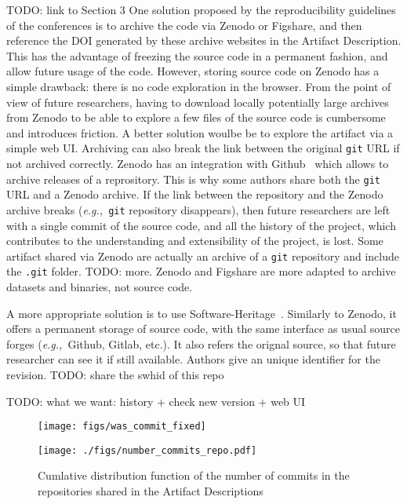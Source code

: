 \documentclass[sigconf,natbib=false]{acmart}
\newcommand{\eg}{\emph{e.g.,}}
\newcommand{\ad}{Artifact Description}
\newcommand{\todo}[1]{{\color{red}TODO: #1}}
\begin{document}
\todo{link to Section 3}
One solution proposed by the reproducibility guidelines of the conferences is to archive the code via Zenodo or Figshare, and then reference the DOI generated by these archive websites in the \ad.
This has the advantage of freezing the source code in a permanent fashion, and allow future usage of the code.
However, storing source code on Zenodo has a simple drawback: there is no code exploration in the browser.
From the point of view of future researchers, having to download locally potentially large archives from Zenodo to be able to explore a few files of the source code is cumbersome and introduces friction.
A better solution woulbe be to explore the artifact via a simple web UI.
Archiving can also break the link between the original \texttt{git} URL if not archived correctly.
Zenodo has an integration with Github\ \cite{github_zenodo} which allows to archive releases of a reprository.
This is why some authors share both the \texttt{git} URL and a Zenodo archive.
If the link between the repository and the Zenodo archive breaks (\eg\ \texttt{git} repository disappears), then future researchers are left with a single commit of the source code, and all the history of the project, which contributes to the understanding and extensibility of the project, is lost.
Some artifact shared via Zenodo are actually an archive of a \texttt{git} repository and include the \texttt{.git} folder.
\todo{more.}
Zenodo and Figshare are more adapted to archive datasets and binaries, not source code.

A more appropriate solution is to use Software-Heritage\ \cite{swheritage, di2017software}.
Similarly to Zenodo, it offers a permanent storage of source code, with the same interface as usual source forges (\eg\ Github, Gitlab, etc.).
It also refers the orignal source, so that future researcher can see it if still available.
Authors give an unique identifier for the revision. 
\todo{share the swhid of this repo}

\todo{what we want: history + check new version + web UI}

\begin{figure}
  \centering
  \texttt{[image: figs/was\_commit\_fixed]}
  \caption{}\label{fig:was_commit_fixed}
\end{figure}

\begin{figure}
  \centering
  \texttt{[image: ./figs/number\_commits\_repo.pdf]}
  \caption{Cumlative distribution function of the number of commits in the repositories shared in the \ad s}\label{fig:number_commits_repo}
\end{figure}
\end{document}
